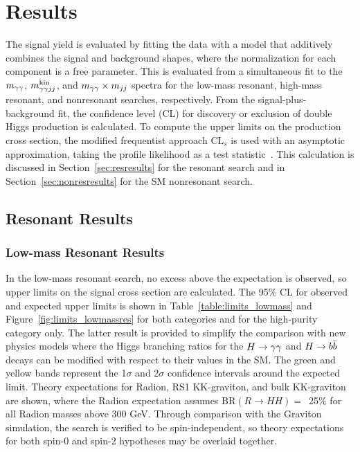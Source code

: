 \chapter{Results\label{ch:results}}

The signal yield is evaluated by fitting the data with a model that additively combines the signal
and background shapes, where the normalization for each component is a free parameter.
This is evaluated from a simultaneous fit to the $m_{\gamma\gamma}$, $m_{\gamma\gamma jj}^{\rm kin}$, and $m_{\gamma\gamma} \times m_{jj}$ spectra
for the low-mass resonant, high-mass resonant, and nonresonant searches, respectively.
From the signal-plus-background fit, the confidence level (CL)
for discovery or exclusion of double Higgs production is calculated.
To compute the upper limits on the production cross section, the modified frequentist approach
$\text{CL}_s$ is used with an asymptotic approximation, taking the profile likelihood as a test
statistic~\cite{CLS1,CLS2}. This calculation is discussed in Section~\ref{sec:resresults} for the
resonant search and in Section~\ref{sec:nonresresults} for the SM nonresonant search.

\section{Resonant Results\label{sec:resresults}}

\subsection{Low-mass Resonant Results}

In the low-mass resonant search,
no excess above the expectation is observed, so upper limits on the signal cross section are calculated.
The 95\% CL for observed and expected upper limits is shown in
Table~\ref{table:limits_lowmass} and Figure~\ref{fig:limits_lowmassres}
for both categories and for the high-purity category only.
The latter result is provided to simplify the comparison with new physics models where
the Higgs branching ratios for the $H\to\gamma\gamma$ and $H\to b\bar{b}$ decays can be modified with respect to their
values in the SM.
The green and yellow bands represent the 1$\sigma$ and 2$\sigma$
confidence intervals around the expected limit. Theory expectations for Radion, RS1 KK-graviton, and 
bulk KK-graviton are shown, where the Radion expectation assumes $\text{BR}(R\rightarrow HH) =$~25\%
for all Radion masses above 300 GeV. Through comparison with the Graviton simulation,
the search is verified to be spin-independent, so theory expectations for both spin-0 and spin-2
hypotheses may be overlaid together.

